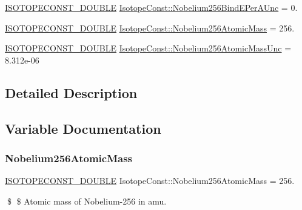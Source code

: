 \begin{DoxyCompactItemize}
\mbox{\hyperlink{group___isotope_const-_macros_ga8f45a7272ce02c0b4c65c44636ed719a}{I\+S\+O\+T\+O\+P\+E\+C\+O\+N\+S\+T\+\_\+\+D\+O\+U\+B\+LE}} \mbox{\hyperlink{group___isotope_const-_nobelium-_no256_ga73700dd162cb2495070daddf2f6be9a1}{Isotope\+Const\+::\+Nobelium256\+Bind\+E\+Per\+A\+Unc}} = 0.
\item 
\mbox{\hyperlink{group___isotope_const-_macros_ga8f45a7272ce02c0b4c65c44636ed719a}{I\+S\+O\+T\+O\+P\+E\+C\+O\+N\+S\+T\+\_\+\+D\+O\+U\+B\+LE}} \mbox{\hyperlink{group___isotope_const-_nobelium-_no256_gae636125e20471794d7619985f43fe093}{Isotope\+Const\+::\+Nobelium256\+Atomic\+Mass}} = 256.
\item 
\mbox{\hyperlink{group___isotope_const-_macros_ga8f45a7272ce02c0b4c65c44636ed719a}{I\+S\+O\+T\+O\+P\+E\+C\+O\+N\+S\+T\+\_\+\+D\+O\+U\+B\+LE}} \mbox{\hyperlink{group___isotope_const-_nobelium-_no256_gaebd926f7909863bc9c2c2f1d850ca2fe}{Isotope\+Const\+::\+Nobelium256\+Atomic\+Mass\+Unc}} = 8.\+312e-\/06
\end{DoxyCompactItemize}


\subsection{Detailed Description}


\subsection{Variable Documentation}
\mbox{\label{group___isotope_const-_nobelium-_no256_gae636125e20471794d7619985f43fe093}} 
\subsubsection{\texorpdfstring{Nobelium256\+Atomic\+Mass}{Nobelium256AtomicMass}}
{\footnotesize\ttfamily \mbox{\hyperlink{group___isotope_const-_macros_ga8f45a7272ce02c0b4c65c44636ed719a}{I\+S\+O\+T\+O\+P\+E\+C\+O\+N\+S\+T\+\_\+\+D\+O\+U\+B\+LE}} Isotope\+Const\+::\+Nobelium256\+Atomic\+Mass = 256.}

\$ \$ Atomic mass of Nobelium-\/256 in amu. \mbox{\label{group___isotope_const-_nobelium-_no256_gaebd926f7909863bc9c2c2f1d850ca2fe}} 
